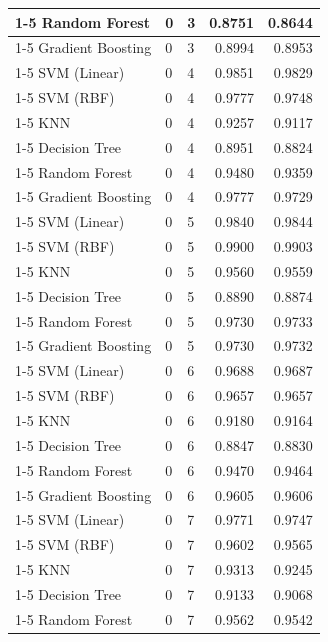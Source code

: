 \begin{table}
\begin{tabular}{lllrr}
\cline{1-5} \cline{2-5}
Random Forest & 0 & 3 & 0.8751 & 0.8644 \\
\cline{1-5} \cline{2-5}
Gradient Boosting & 0 & 3 & 0.8994 & 0.8953 \\
\cline{1-5} \cline{2-5}
SVM (Linear) & 0 & 4 & 0.9851 & 0.9829 \\
\cline{1-5} \cline{2-5}
SVM (RBF) & 0 & 4 & 0.9777 & 0.9748 \\
\cline{1-5} \cline{2-5}
KNN & 0 & 4 & 0.9257 & 0.9117 \\
\cline{1-5} \cline{2-5}
Decision Tree & 0 & 4 & 0.8951 & 0.8824 \\
\cline{1-5} \cline{2-5}
Random Forest & 0 & 4 & 0.9480 & 0.9359 \\
\cline{1-5} \cline{2-5}
Gradient Boosting & 0 & 4 & 0.9777 & 0.9729 \\
\cline{1-5} \cline{2-5}
SVM (Linear) & 0 & 5 & 0.9840 & 0.9844 \\
\cline{1-5} \cline{2-5}
SVM (RBF) & 0 & 5 & 0.9900 & 0.9903 \\
\cline{1-5} \cline{2-5}
KNN & 0 & 5 & 0.9560 & 0.9559 \\
\cline{1-5} \cline{2-5}
Decision Tree & 0 & 5 & 0.8890 & 0.8874 \\
\cline{1-5} \cline{2-5}
Random Forest & 0 & 5 & 0.9730 & 0.9733 \\
\cline{1-5} \cline{2-5}
Gradient Boosting & 0 & 5 & 0.9730 & 0.9732 \\
\cline{1-5} \cline{2-5}
SVM (Linear) & 0 & 6 & 0.9688 & 0.9687 \\
\cline{1-5} \cline{2-5}
SVM (RBF) & 0 & 6 & 0.9657 & 0.9657 \\
\cline{1-5} \cline{2-5}
KNN & 0 & 6 & 0.9180 & 0.9164 \\
\cline{1-5} \cline{2-5}
Decision Tree & 0 & 6 & 0.8847 & 0.8830 \\
\cline{1-5} \cline{2-5}
Random Forest & 0 & 6 & 0.9470 & 0.9464 \\
\cline{1-5} \cline{2-5}
Gradient Boosting & 0 & 6 & 0.9605 & 0.9606 \\
\cline{1-5} \cline{2-5}
SVM (Linear) & 0 & 7 & 0.9771 & 0.9747 \\
\cline{1-5} \cline{2-5}
SVM (RBF) & 0 & 7 & 0.9602 & 0.9565 \\
\cline{1-5} \cline{2-5}
KNN & 0 & 7 & 0.9313 & 0.9245 \\
\cline{1-5} \cline{2-5}
Decision Tree & 0 & 7 & 0.9133 & 0.9068 \\
\cline{1-5} \cline{2-5}
Random Forest & 0 & 7 & 0.9562 & 0.9542 \\

\end{tabular}
\end{table}
